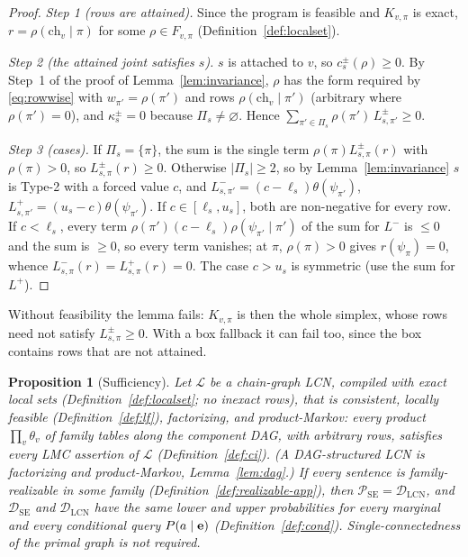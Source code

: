 \documentclass{article} %
\newtheorem{proposition}{Proposition}
\newcommand{\DSE}{\mathcal{D}_{\mathrm{SE}}}
\newcommand{\DLCN}{\mathcal{D}_{\mathrm{LCN}}}
\newcommand{\ch}{\mathrm{ch}}
\begin{document}
\begin{proof}
\emph{Step 1 (rows are attained).} Since the program is feasible and $K_{v,\pi}$ is exact, $r=\rho(\ch_v\mid\pi)$
for some $\rho\in F_{v,\pi}$ (Definition~\ref{def:localset}).

\emph{Step 2 (the attained joint satisfies $s$).} $s$ is attached to $v$, so $c_s^\pm(\rho)\ge0$. By
Step~1 of the proof of Lemma~\ref{lem:invariance}, $\rho$ has the form required by
\eqref{eq:rowwise} with $w_{\pi'}=\rho(\pi')$ and rows $\rho(\ch_v\mid\pi')$ (arbitrary where
$\rho(\pi')=0$), and $\kappa_s^\pm=0$ because $\Pi_s\ne\varnothing$. Hence
$\sum_{\pi'\in\Pi_s}\rho(\pi')\,L^\pm_{s,\pi'}\ge0$.

\emph{Step 3 (cases).} If $\Pi_s=\{\pi\}$, the sum is the single term $\rho(\pi)L^\pm_{s,\pi}(r)$
with $\rho(\pi)>0$, so $L^\pm_{s,\pi}(r)\ge0$. Otherwise $|\Pi_s|\ge2$, so by
Lemma~\ref{lem:invariance} $s$ is Type-2 with a forced value $c$, and
$L^-_{s,\pi'}=(c-\ell_s)\theta(\psi_{\pi'})$, $L^+_{s,\pi'}=(u_s-c)\theta(\psi_{\pi'})$. If
$c\in[\ell_s,u_s]$, both are non-negative for every row. If $c<\ell_s$, every term
$\rho(\pi')(c-\ell_s)\rho(\psi_{\pi'}\mid\pi')$ of the sum for $L^-$ is $\le0$ and the sum is
$\ge0$, so every term vanishes; at $\pi$, $\rho(\pi)>0$ gives $r(\psi_\pi)=0$, whence
$L^-_{s,\pi}(r)=L^+_{s,\pi}(r)=0$. The case $c>u_s$ is symmetric (use the sum for $L^+$).
\end{proof}

Without feasibility the lemma fails: $K_{v,\pi}$ is then the whole simplex, whose rows need not
satisfy $L^\pm_{s,\pi}\ge0$. With a box fallback it can fail too, since the box contains rows that
are not attained.

\begin{proposition}[Sufficiency]\label{prop:suff-app}
Let $\mathcal L$ be a chain-graph LCN, compiled with exact local sets (Definition~\ref{def:localset};
no inexact rows), that is consistent, locally feasible (Definition~\ref{def:lf}), factorizing, and
\emph{product-Markov}: every product $\prod_v\theta_v$ of family tables along the component DAG, with
arbitrary rows, satisfies every LMC assertion of $\mathcal L$ (Definition~\ref{def:ci}). (A
DAG-structured LCN is factorizing and product-Markov, Lemma~\ref{lem:dag}.) If every sentence is
family-realizable in some family (Definition~\ref{def:realizable-app}), then
$\mathcal P_{\mathrm{SE}}=\DLCN$, and $\DSE$ and $\DLCN$ have the same lower and upper probabilities
for every marginal and every conditional query $P(a\mid\mathbf{e})$ (Definition~\ref{def:cond}).
\emph{Single-connectedness of the primal graph is not required.}
\end{proposition}
\end{document}
